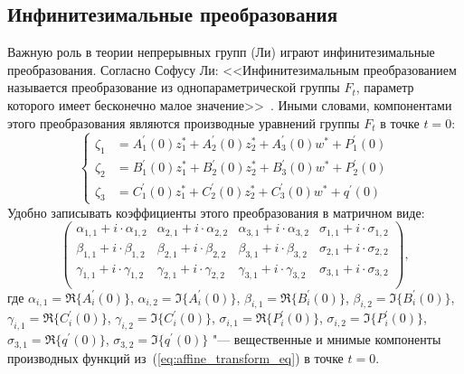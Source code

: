 \documentclass[../main.tex]{subfiles}
\begin{document}
\subsection{Инфинитезимальные преобразования}
Важную роль в теории непрерывных групп (Ли) играют инфинитезимальные преобразования. Согласно Софусу Ли: <<Инфинитезимальным преобразованием называется преобразование из однопараметрической группы $F_t$, параметр которого имеет бесконечно малое значение>>~\cite{lie}. Иными словами, компонентами этого преобразования являются производные уравнений группы $F_t$ в точке $t = 0$:
\begin{equation*}
	\begin{cases}
     \zeta_1 &=A^{\prime}_{1}(0) z_1^* + A^{\prime}_{2}(0) z_2^* + A^{\prime}_{3}(0) w^* + P^{\prime}_1(0) \\
     \zeta_2 &=B^{\prime}_{1}(0) z_1^* + B^{\prime}_{2}(0) z_2^* + B^{\prime}_{3}(0) w^* + P^{\prime}_2(0) \\
     \zeta_3 &=C^{\prime}_{1}(0) z_1^* + C^{\prime}_{2}(0) z_2^* + C^{\prime}_{3}(0) w^* + q^{\prime}(0)
  \end{cases}
\end{equation*}
Удобно записывать коэффициенты этого преобразования в матричном виде:
\begin{equation}\label{eq:infinitesimal_matrix}
\begin{pmatrix}
\alpha_{1,1} + i\cdot\alpha_{1,2} & \alpha_{2,1} + i\cdot\alpha_{2,2} & \alpha_{3,1} + i\cdot\alpha_{3,2} & \sigma_{1,1} + i\cdot\sigma_{1,2} \\
 \beta_{1,1} +  i\cdot\beta_{1,2} &  \beta_{2,1} +  i\cdot\beta_{2,2} &  \beta_{3,1} +  i\cdot\beta_{3,2} & \sigma_{2,1} + i\cdot\sigma_{2,2} \\
\gamma_{1,1} + i\cdot\gamma_{1,2} & \gamma_{2,1} + i\cdot\gamma_{2,2} & \gamma_{3,1} + i\cdot\gamma_{3,2} & \sigma_{3,1} + i\cdot\sigma_{3,2} \\
\end{pmatrix},
\end{equation}
где $\alpha_{i,1} = \Re\{A^{\prime}_{i}(0)\}$, $\alpha_{i,2} = \Im\{A^{\prime}_{i}(0)\}$, $\beta_{i,1} = \Re\{B^{\prime}_{i}(0)\}$, $\beta_{i,2} = \Im\{B^{\prime}_{i}(0)\}$, $\gamma_{i,1} = \Re\{C^{\prime}_{i}(0)\}$, $\gamma_{i,2} = \Im\{C^{\prime}_{i}(0)\}$, $\sigma_{i,1} = \Re\{P^{\prime}_{i}(0)\}$, $\sigma_{i,2} = \Im\{P^{\prime}_{i}(0)\}$, $\sigma_{3,1} = \Re\{q^{\prime}(0)\}$, $\sigma_{3,2} = \Im\{q^{\prime}(0)\}$ "--- вещественные и мнимые компоненты производных функций из~(\ref{eq:affine_transform_eq}) в точке $t = 0$.
\end{document}
